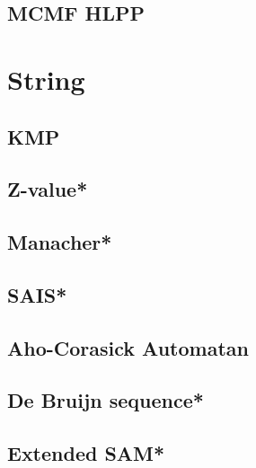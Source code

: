 \subsection{MCMF HLPP}



\section{String}
\subsection{KMP}

\subsection{Z-value*} %

\subsection{Manacher*} %

%
\subsection{SAIS*} %

\subsection{Aho-Corasick Automatan}

%
\subsection{De Bruijn sequence*} %

\subsection{Extended SAM*} %

